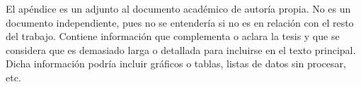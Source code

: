 

El apéndice es un adjunto al documento académico de autoría propia. No es un documento independiente, pues no se entendería si no es en relación con el resto del trabajo. Contiene información que complementa o aclara la tesis y que se considera que es demasiado larga o detallada para incluirse en el texto principal. Dicha información podría incluir gráficos o tablas, listas de datos sin procesar, etc.
